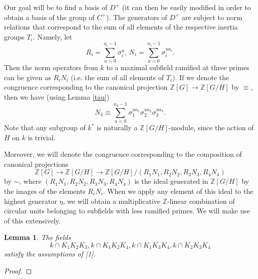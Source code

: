 \documentclass[12pt,a4paper]{article}
\newtheorem{lemma}[theorem]{Lemma}
\theoremstyle{definition}
\newcommand{\Z}{\mathbb{Z}}
\begin{document}


Our goal will be to find a basis of $D^+$ (it can then be easily modified in order to obtain a basis of the group of $C^+$). The generators of $D^+$ are subject to norm relations that correspond to the sum of all elements of the respective inertia groups $T_i$. Namely, let $$R_i=\sum_{u=0}^{a_i-1}\sigma_i^u,\, N_i=\sum_{u=0}^{n_i-1}\sigma_i^{ua_i}.$$ 
Then the norm operators from $k$ to a maximal subfield ramified at three primes can be given as $R_iN_i$ (i.e. the sum of all elements of $T_i$). If we denote the congruence corresponding to the canonical projection $\Z[G]\to \Z[G/H]$ by $\equiv$, then we have (using Lemma \ref{tau}) $$N_4\equiv \sum_{u=0}^{n_4-1}\sigma_1^{ua_1}\sigma_2^{ua_2}\sigma_3^{ua_3}.$$ Note that any subgroup of $k^*$ is naturally a $\Z[G/H]$-module, since the action of $H$ on $k$ is trivial.

Moreover, we will denote the congruence corresponding to the composition of canonical projections $$\Z[G]\to \Z[G/H]\to \Z[G/H]/(R_1N_1,R_2N_2,R_3N_3,R_4N_4)$$ by $\sim$, where $(R_1N_1,R_2N_2,R_3N_3,R_4N_4)$ is the ideal generated in $\Z[G/H]$ by the images of the elements $R_iN_i$. When we apply any element of this ideal to the highest generator $\eta$, we will obtain a multiplicative $\Z$-linear combination of circular units belonging to subfields with less ramified primes. We will make use of this extensively.

\begin{lemma}
The fields $$k\cap K_1K_2K_3,k\cap K_1K_2K_4,k\cap K_1K_3K_4,k\cap K_2K_3K_4$$ satisfy the assumptions of [1].
\end{lemma}
\begin{proof}
\end{proof}
\end{document}
